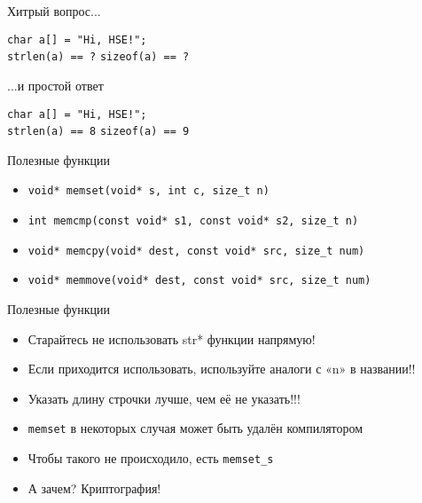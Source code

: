 \documentclass[10pt,pdf,hyperref={unicode}]{beamer}
\begin{document}
\begin{frame}{Хитрый вопрос...}
    \Huge\begin{center}
        \lstinline{char a[] = "Hi, HSE!";} \\
        \lstinline{strlen(a) == ?}
        \lstinline{sizeof(a) == ?}
    \end{center}
\end{frame}


\begin{frame}{...и простой ответ}
    \Huge\begin{center}
        \lstinline{char a[] = "Hi, HSE!";} \\
        \lstinline{strlen(a) == 8}
        \lstinline{sizeof(a) == 9}
    \end{center}
\end{frame}

\begin{frame}{Полезные функции}
\begin{itemize}
    \item \lstinline{void* memset(void* s, int c, size_t n)}
    \item \lstinline{int memcmp(const void* s1, const void* s2, size_t n)}
    \item \lstinline{void* memcpy(void* dest, const void* src, size_t num)}
    \item \lstinline{void* memmove(void* dest, const void* src, size_t num)}
\end{itemize}
\end{frame}

\begin{frame}{Полезные функции}
\begin{itemize}
    \item Старайтесь не использовать str* функции напрямую!
    \item Если приходится использовать, используйте аналоги с «n» в названии!!
    \item Указать длину строчки лучше, чем её не указать!!!
\end{itemize}
\end{frame}

\begin{frame}
\begin{itemize}
    \item \lstinline{memset} в некоторых случая может быть удалён компилятором
    \item Чтобы такого не происходило, есть \lstinline{memset_s}
    \item А зачем?  Криптография!
\end{itemize}
\end{frame}
\end{document}
